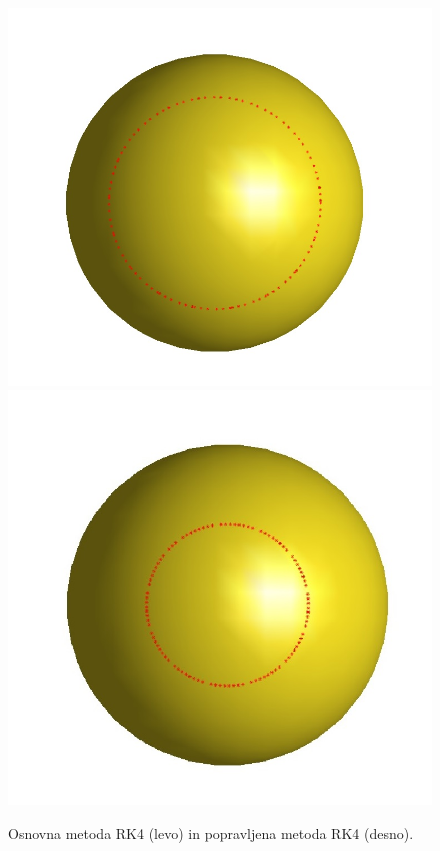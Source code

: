 \documentclass[12pt]{article}
\begin{document}
	\begin{figure}[H]
		\centering
		\includegraphics[scale=0.30]{rk4}
		\includegraphics[scale=0.30]{rk4_newt}
		\caption{Osnovna metoda RK4 (levo) in popravljena metoda RK4 (desno).}
		\label{slika:rk4,rk4_newt}
	\end{figure}
	
\end{document}
